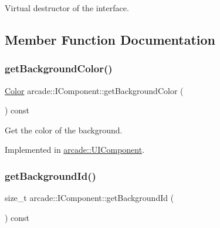 Virtual destructor of the interface. 



\subsection{Member Function Documentation}
\mbox{\label{classarcade_1_1_i_component_a99301c61be2a21ef8a274727ba781a00}} 
\subsubsection{\texorpdfstring{get\+Background\+Color()}{getBackgroundColor()}}
{\footnotesize\ttfamily \hyperlink{unionarcade_1_1_color}{Color} arcade\+::\+I\+Component\+::get\+Background\+Color (\begin{DoxyParamCaption}{ }\end{DoxyParamCaption}) const\hspace{0.3cm}{\ttfamily [pure virtual]}}



Get the color of the background. 



Implemented in \hyperlink{classarcade_1_1_u_i_component_a981bbd394540b39ca0c7c0f760ef9551}{arcade\+::\+U\+I\+Component}.

\mbox{\label{classarcade_1_1_i_component_a7d4c00172b0ba0e3dc63832a9234efbb}} 
\subsubsection{\texorpdfstring{get\+Background\+Id()}{getBackgroundId()}}
{\footnotesize\ttfamily size\+\_\+t arcade\+::\+I\+Component\+::get\+Background\+Id (\begin{DoxyParamCaption}{ }\end{DoxyParamCaption}) const\hspace{0.3cm}{\ttfamily [pure virtual]}}



